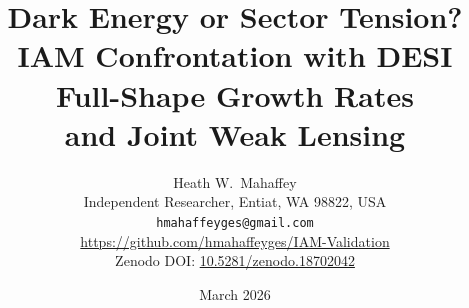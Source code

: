 \documentclass[12pt,a4paper]{article}
\begin{document}
\title{\textbf{Dark Energy or Sector Tension?}\\[4pt]
IAM Confrontation with DESI Full-Shape Growth Rates\\
and Joint Weak Lensing}

\author{
  Heath W.\ Mahaffey\\[4pt]
  \small Independent Researcher, Entiat, WA 98822, USA\\[2pt]
  \small \texttt{hmahaffeyges@gmail.com}\\
  \small \url{https://github.com/hmahaffeyges/IAM-Validation}\\
  \small Zenodo DOI: \href{https://doi.org/10.5281/zenodo.18702042}{10.5281/zenodo.18702042}
}

\date{March 2026}
\maketitle
\end{document}
